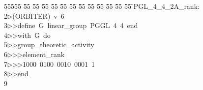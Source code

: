 %
%
\begin{tabbing}
55555 \= 55 \= 55 \= 55 \= 55 \= 55 \= 55 \= 55 \= 55 \= 55 \= 55 \= 55 \= 55 \= \>PGL\_4\_4\_2A\_rank:\\[0pt]
2\>$\triangleright$\>(ORBITER)\ v\ 6\ \\[0pt]
3\>$\triangleright$\>$\triangleright$\>define\ G\ linear\_group\ PGGL\ 4\ 4\ end\ \\[0pt]
4\>$\triangleright$\>$\triangleright$\>with\ G\ do\ \\[0pt]
5\>$\triangleright$\>$\triangleright$\>group\_theoretic\_activity\ \\[0pt]
6\>$\triangleright$\>$\triangleright$\>$\triangleright$\>element\_rank\ \\[0pt]
7\>$\triangleright$\>$\triangleright$\>$\triangleright$\>1000\ 0100\ 0010\ 0001\ 1\ \\[0pt]
8\>$\triangleright$\>$\triangleright$\>end\\[0pt]
9\>\end{tabbing}
